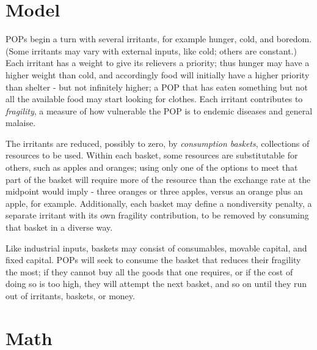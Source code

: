 \documentclass[12pt]{book}
\begin{document}
\section{Model}

POPs begin a turn with several irritants, for example hunger, cold,
and boredom. (Some irritants may vary with external inputs, like cold;
others are constant.) Each irritant has a weight to give its relievers
a priority; thus hunger may have a higher weight than cold, and
accordingly food will initially have a higher priority than shelter -
but not infinitely higher; a POP that has eaten something but not all
the available food may start looking for clothes. Each irritant
contributes to \emph{fragility}, a measure of how vulnerable the POP
is to endemic diseases and general malaise.

The irritants are reduced, possibly to zero, by \emph{consumption
  baskets}, collections of resources to be used. Within each basket,
some resources are substitutable for others, such as apples and
oranges; using only one of the options to meet that part of the basket
will require more of the resource than the exchange rate at the
midpoint would imply - three oranges or three apples, versus an orange
plus an apple, for example. Additionally, each basket may define a
nondiversity penalty, a separate irritant with its own fragility
contribution, to be removed by consuming that basket in a diverse
way. 

Like industrial inputs, baskets may consist of consumables, movable
capital, and fixed capital. POPs will seek to consume the basket that
reduces their fragility the most; if they cannot buy all the goods
that one requires, or if the cost of doing so is too high, they will
attempt the next basket, and so on until they run out of irritants,
baskets, or money.

\section{Math}
\end{document}
